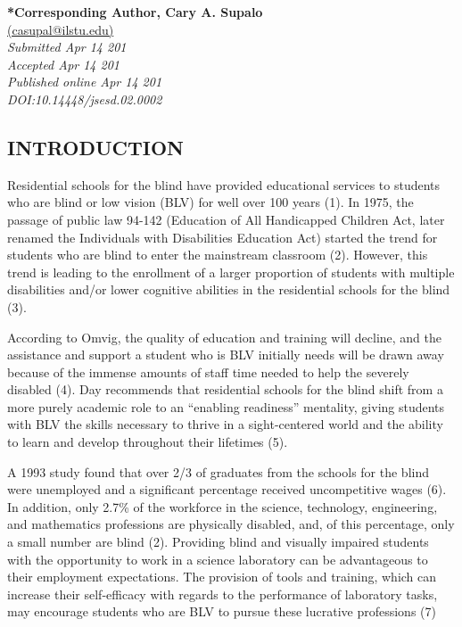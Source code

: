 \documentclass[11.5pt]{sig-alternate} %
\begin{document}
\textbf{*Corresponding Author, Cary A. Supalo}\\
\href{mailto:casupal@ilstu.edu}{(casupal@ilstu.edu)} \\
\textit{Submitted  Apr 14 201}\\
\textit{Accepted Apr 14 201} \\
\textit{Published online Apr 14 201 } \\
\textit{DOI:10.14448/jsesd.02.0002} \\
\pagebreak
\clearpage
\begin{large}
\section*{INTRODUCTION}

Residential schools for the blind have provided educational services to students who are blind or low vision (BLV) for well over 100 years (1). In 1975, the passage of public law 94-142 (Education of All Handicapped Children Act, later renamed the Individuals with Disabilities Education Act) started the trend for students who are blind to enter the mainstream classroom (2). However, this trend is leading to the enrollment of a larger proportion of students with multiple disabilities and/or lower cognitive abilities in the residential schools for the blind (3). 

According to Omvig, the quality of education and training will decline, and the assistance and support a student who is BLV initially needs will be drawn away because of the immense amounts of staff time needed to help the severely disabled (4). Day recommends that residential schools for the blind shift from a more purely academic role to an “enabling readiness” mentality, giving students with BLV the skills necessary to thrive in a sight-centered world and the ability to learn and develop throughout their lifetimes (5). 

A 1993 study found that over 2/3 of graduates from the schools for the blind were unemployed and a significant percentage received uncompetitive wages (6). In addition, only 2.7\% of the workforce in the science, technology, engineering, and mathematics professions are physically disabled, and, of this percentage, only a small number are blind (2). Providing blind and visually impaired students with the opportunity to work in a science laboratory can be advantageous to their employment expectations. The provision of tools and training, which can increase their self-efficacy with regards to the performance of laboratory tasks, may encourage students who are BLV to pursue these lucrative professions (7)


\end{large}
\end{document}

